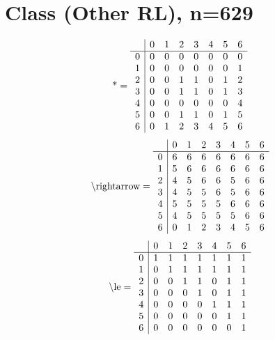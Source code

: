 \documentclass[11pt]{article}
\begin{document}
\section{Class (Other RL), n=629}
\[\text{*} = 
\begin{array}{r | r r r r r r r}
 & 0 & 1 & 2 & 3 & 4 & 5 & 6 \\ \hline
0 & 0 & 0 & 0 & 0 & 0 & 0 & 0 \\
1 & 0 & 0 & 0 & 0 & 0 & 0 & 1 \\
2 & 0 & 0 & 1 & 1 & 0 & 1 & 2 \\
3 & 0 & 0 & 1 & 1 & 0 & 1 & 3 \\
4 & 0 & 0 & 0 & 0 & 0 & 0 & 4 \\
5 & 0 & 0 & 1 & 1 & 0 & 1 & 5 \\
6 & 0 & 1 & 2 & 3 & 4 & 5 & 6 \\
\end{array}
\]
\[\text{\textbackslash rightarrow} = 
\begin{array}{r | r r r r r r r}
 & 0 & 1 & 2 & 3 & 4 & 5 & 6 \\ \hline
0 & 6 & 6 & 6 & 6 & 6 & 6 & 6 \\
1 & 5 & 6 & 6 & 6 & 6 & 6 & 6 \\
2 & 4 & 5 & 6 & 6 & 5 & 6 & 6 \\
3 & 4 & 5 & 5 & 6 & 5 & 6 & 6 \\
4 & 5 & 5 & 5 & 5 & 6 & 6 & 6 \\
5 & 4 & 5 & 5 & 5 & 5 & 6 & 6 \\
6 & 0 & 1 & 2 & 3 & 4 & 5 & 6 \\
\end{array}
\]
\[\text{\textbackslash le} = 
\begin{array}{r | r r r r r r r}
 & 0 & 1 & 2 & 3 & 4 & 5 & 6 \\ \hline
0 & 1 & 1 & 1 & 1 & 1 & 1 & 1 \\
1 & 0 & 1 & 1 & 1 & 1 & 1 & 1 \\
2 & 0 & 0 & 1 & 1 & 0 & 1 & 1 \\
3 & 0 & 0 & 0 & 1 & 0 & 1 & 1 \\
4 & 0 & 0 & 0 & 0 & 1 & 1 & 1 \\
5 & 0 & 0 & 0 & 0 & 0 & 1 & 1 \\
6 & 0 & 0 & 0 & 0 & 0 & 0 & 1 \\
\end{array}
\]
\end{document}
